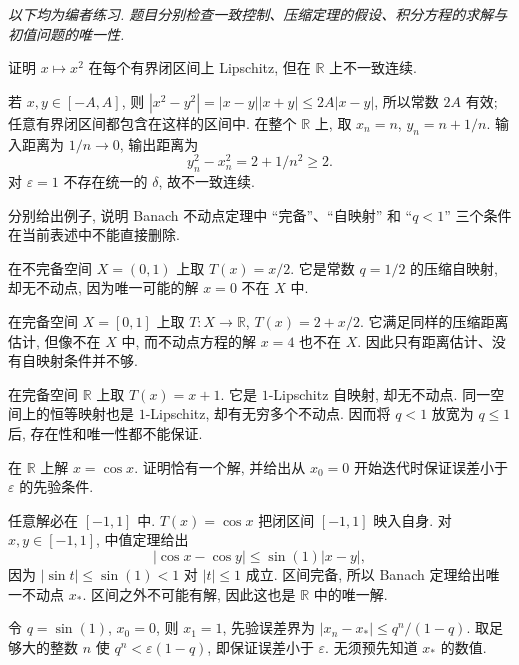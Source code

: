 
\emph{以下均为编者练习. 题目分别检查一致控制、压缩定理的假设、积分方程的求解与初值问题的唯一性.}

\begin{exercise}\label{ex:uniform-x-square}
证明 $x\mapsto x^2$ 在每个有界闭区间上 Lipschitz, 但在 $\mathbb R$ 上不一致连续.
\end{exercise}
\begin{solution}
若 $x,y\in[-A,A]$, 则
$|x^2-y^2|=|x-y||x+y|\leq2A|x-y|$, 所以常数 $2A$ 有效; 任意有界闭区间都包含在这样的区间中. 在整个 $\mathbb R$ 上, 取 $x_n=n$, $y_n=n+1/n$. 输入距离为 $1/n\to0$, 输出距离为
\[
y_n^2-x_n^2=2+1/n^2\geq2.
\]
对 $\varepsilon=1$ 不存在统一的 $\delta$, 故不一致连续.
\end{solution}

\begin{exercise}\label{ex:banach-assumptions}
分别给出例子, 说明 Banach 不动点定理中 ``完备''、``自映射'' 和 ``$q<1$'' 三个条件在当前表述中不能直接删除.
\end{exercise}
\begin{solution}
在不完备空间 $X=(0,1)$ 上取 $T(x)=x/2$. 它是常数 $q=1/2$ 的压缩自映射, 却无不动点, 因为唯一可能的解 $x=0$ 不在 $X$ 中.

在完备空间 $X=[0,1]$ 上取 $T:X\to\mathbb R$, $T(x)=2+x/2$. 它满足同样的压缩距离估计, 但像不在 $X$ 中, 而不动点方程的解 $x=4$ 也不在 $X$. 因此只有距离估计、没有自映射条件并不够.

在完备空间 $\mathbb R$ 上取 $T(x)=x+1$. 它是 $1$-Lipschitz 自映射, 却无不动点. 同一空间上的恒等映射也是 $1$-Lipschitz, 却有无穷多个不动点. 因而将 $q<1$ 放宽为 $q\leq1$ 后, 存在性和唯一性都不能保证.
\end{solution}

\begin{exercise}\label{ex:scalar-contraction-error}
在 $\mathbb R$ 上解 $x=\cos x$. 证明恰有一个解, 并给出从 $x_0=0$ 开始迭代时保证误差小于 $\varepsilon$ 的先验条件.
\end{exercise}
\begin{solution}
任意解必在 $[-1,1]$ 中. $T(x)=\cos x$ 把闭区间 $[-1,1]$ 映入自身. 对 $x,y\in[-1,1]$, 中值定理给出
\[
|\cos x-\cos y|\leq\sin(1)|x-y|,
\]
因为 $|\sin t|\leq\sin(1)<1$ 对 $|t|\leq1$ 成立. 区间完备, 所以 Banach 定理给出唯一不动点 $x_*$. 区间之外不可能有解, 因此这也是 $\mathbb R$ 中的唯一解.

令 $q=\sin(1)$, $x_0=0$, 则 $x_1=1$, 先验误差界为
$|x_n-x_*|\leq q^n/(1-q)$. 取足够大的整数 $n$ 使
$q^n<\varepsilon(1-q)$, 即保证误差小于 $\varepsilon$. 无须预先知道 $x_*$ 的数值.
\end{solution}

